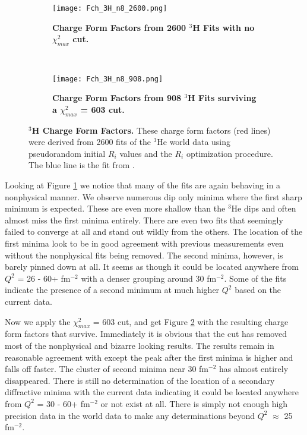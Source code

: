 \begin{figure}[!ht]
\begin{subfigure}{1.\textwidth}
  \centering
  \texttt{[image: Fch\_3H\_n8\_2600.png]}
  \caption{\bf{Charge Form Factors from 2600 $^3$H Fits with no $\chi^2_{max}$ cut.}}
  \label{fig:3h_fch_no_cut}
\end{subfigure}\\
\begin{subfigure}{1.\textwidth}
  \centering
  \texttt{[image: Fch\_3H\_n8\_908.png]}
  \caption{\bf{Charge Form Factors from 908 $^3$H Fits surviving a $\chi^2_{max}$ = 603 cut.}}
  \label{fig:3h_fch_cut}
\end{subfigure}
\caption[$^3$H Charge Form Factors] {
{\bf{$^3$H Charge Form Factors.}} These charge form factors (red lines) were derived from 2600 fits of the $^3$He world data using pseudorandom initial $R_i$ values and the $R_i$ optimization procedure. The blue line is the fit from \cite{Article:Amroun}.}
\label{fig:3h_fch}
\end{figure}

Looking at Figure \ref{fig:3h_fch_no_cut} we notice that many of the fits are again behaving in a nonphysical manner. We observe numerous dip only minima where the first sharp minimum is expected. These are even more shallow than the $^3$He dips and often almost miss the first minima entirely. There are even two fits that seemingly failed to converge at all and stand out wildly from the others. The location of the first minima look to be in good agreement with previous measurements even without the nonphysical fits being removed. The second minima, however, is barely pinned down at all. It seems as though it could be located anywhere from $Q^2$ = 26 - 60+ fm$^{-2}$ with a denser grouping around 30 fm$^{-2}$. Some of the fits indicate the presence of a second minimum at much higher $Q^2$ based on the current data. 

Now we apply the $\chi^2_{max}$ = 603 cut, and get Figure \ref{fig:3h_fch_cut} with the resulting charge form factors that survive. Immediately it is obvious that the cut has removed most of the nonphysical and bizarre looking results. The results remain in reasonable agreement with \cite{Article:Amroun} except the peak after the first minima is higher and falls off faster. The cluster of second minima near 30 fm$^{-2}$ has almost entirely disappeared. There is still no determination of the location of a secondary diffractive minima with the current data indicating it could be located anywhere from  $Q^2$ = 30 - 60+ fm$^{-2}$ or not exist at all. There is simply not enough high precision data in the world data to make any determinations beyond $Q^2$ $\approx$ 25 fm$^{-2}$.

